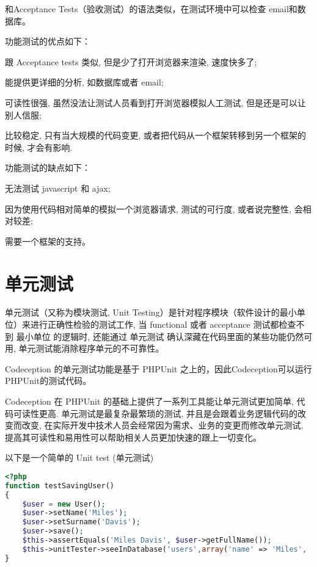 和Acceptance Tests（验收测试）的语法类似，在测试环境中可以检查 email和数据库。

功能测试的优点如下：

\begin{compactitem}
\item 跟 Acceptance tests 类似, 但是少了打开浏览器来渲染, 速度快多了;
\item 能提供更详细的分析, 如数据库或者 email;
\item 可读性很强, 虽然没法让测试人员看到打开浏览器模拟人工测试, 但是还是可以让别人信服;
\item 比较稳定, 只有当大规模的代码变更, 或者把代码从一个框架转移到另一个框架的时候, 才会有影响.
\end{compactitem}

功能测试的缺点如下：

\begin{compactitem}
\item 无法测试 javascript 和 ajax;
\item 因为使用代码相对简单的模拟一个浏览器请求, 测试的可行度, 或者说完整性, 会相对较差;
\item 需要一个框架的支持。
\end{compactitem}

\section{单元测试}


单元测试（又称为模块测试, Unit Testing）是针对程序模块（软件设计的最小单位）来进行正确性检验的测试工作, 当 functional 或者 acceptance 测试都检查不到 最小单位 的逻辑时, 还能通过 单元测试 确认深藏在代码里面的某些功能仍然可用, 单元测试能消除程序单元的不可靠性。


Codeception 的单元测试功能是基于 PHPUnit 之上的，因此Codeception可以运行PHPUnit的测试代码。

Codeception 在 PHPUnit 的基础上提供了一系列工具能让单元测试更加简单, 代码可读性更高. 单元测试是最复杂最繁琐的测试, 并且是会跟着业务逻辑代码的改变而改变, 在实际开发中技术人员会经常因为需求、业务的变更而修改单元测试, 提高其可读性和易用性可以帮助相关人员更加快速的跟上一切变化。


以下是一个简单的 Unit test (单元测试)


\begin{lstlisting}[language=PHP]
<?php
function testSavingUser()
{
    $user = new User();
    $user->setName('Miles');
    $user->setSurname('Davis');
    $user->save();
    $this->assertEquals('Miles Davis', $user->getFullName());
    $this->unitTester->seeInDatabase('users',array('name' => 'Miles', 'surname' => 'Davis'));
}
\end{lstlisting}

